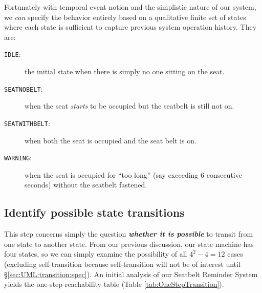 \documentclass[12pt,a4paper]{scrartcl}
\begin{document}
	Fortunately with temporal event notion and the simplistic nature of our system, we \textit{can} specify the behavior entirely based on a qualitative finite set of states where each state is sufficient to capture previous system operation history.
	They are:
	\begin{description}
		\item [\texttt{IDLE}:] the initial state when there is simply no one sitting on the seat.
		\item [\texttt{SEAT\textunderscore NO\textunderscore BELT}:]	when the seat \textit{starts} to be occupied but the seatbelt is still not on.
		\item [\texttt{SEAT\textunderscore WITH\textunderscore BELT}:]	when both the seat is occupied and the seat belt is on.
		\item [\texttt{WARNING}:] when the seat is occupied for ``too long'' (say exceeding 6 consecutive seconds) without the seatbelt fastened.
	\end{description}
	
	
	
	\subsection{Identify possible state transitions} \label{sec:UML:reachbility}
	This step concerns simply the question 
	\textbf{\emph{whether it is possible}} to transit 
	from one state to another state.	
	From our previous discussion, our state machine has four states, so we can simply examine the possibility of all $4^2 - 4 = 12$ cases (excluding self-transition because self-transition will not be of interest until \S \ref{sec:UML:transition:spec}). 	
	An initial analysis of our Seatbelt Reminder System yields the one-step reachability table (Table \ref{tab:OneStepTransition}).
	
\end{document}
